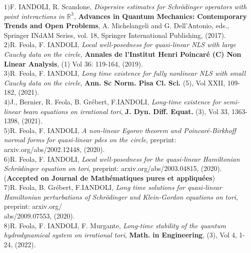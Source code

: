 \documentclass[margin,line,pifont,palatino,courier]{res}
\begin{document}
\begin{resume}
$1)${\rm{F. IANDOLI, R. Scandone}},  \textit{Dispersive estimates for Schr\"odinger operators with point interactions in $\mathbb{R}^3$,}  {\textbf {Advances in Quantum Mechanics: Contemporary Trends and Open Problems}}, A. Michelangeli and G. Dell'Antonio, eds., Springer INdAM Series, vol. 18, Springer International Publishing, (2017).\vspace{0.1cm}\\
$2)${\rm{R. Feola, F. IANDOLI}},  \textit{Local well-posedness for quasi-linear NLS with large Cauchy data on the circle,}  \textbf{Annales de l'Institut Henri Poincar\'e (C) Non Linear Analysis}, (1) Vol 36: 119-164, (2019).\vspace{0.1cm}\\
$3)${\rm{R. Feola, F. IANDOLI}}, \textit{Long time existence for fully nonlinear NLS with small Cauchy data on the circle},   \textbf{Ann. Sc Norm.  Pisa Cl. Sci.} (5), Vol XXII, 109-182, (2021).\vspace{0.1cm}\\
$4)${\rm{J., Bernier, R. Feola, B. Gr\'ebert, F.IANDOLI}}, \textit{Long-time existence for semi-linear beam equations on irrational tori},  \textbf{J. Dyn. Diff. Equat.} (3), Vol 33, 1363-1398, (2021). \vspace{0.1cm}\\
$5)${\rm{R. Feola, F. IANDOLI}}, \textit{A non-linear Egorov theorem and Poincar\'e-Birkhoff normal forms for quasi-linear pdes on the circle}, preprint: arxiv.org/abs/2002.12448, (2020).\vspace{0.1cm}\\
$6)${\rm{R. Feola, F. IANDOLI}}, \textit{Local well-posedness for the quasi-linear Hamiltonian Schr\"odinger equation on tori}, preprint: arxiv.org/abs/2003.04815, (2020). (\textbf{Accepted on Journal de Math\'ematiques pures et appliqu\'ees})\vspace{0.1cm}\\
$7)${\rm{R. Feola, B. Gr\'ebert, F.IANDOLI}}, \textit{Long time solutions for quasi-linear Hamiltonian perturbations of Schr\"odinger and Klein-Gordon equations on tori}, preprint: arxiv.org/\\abs/2009.07553, (2020). \vspace{0.1cm}\\
$8)${\rm{R. Feola, F. IANDOLI, F. Murgante}}, \textit{Long-time stability of the quantum hydrodynamical system on irrational tori}, \textbf{Math. in Engineering}, (3), Vol 4, 1-24, (2022).\vspace{0.1cm}\\




\end{resume}
\end{document}
